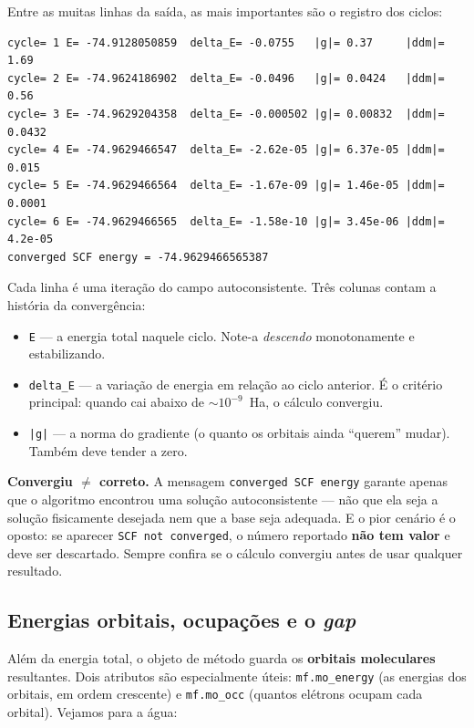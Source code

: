 \documentclass[11pt,a4paper,openany]{book}
\newcommand{\code}[1]{\texttt{#1}}
\begin{document}
\noindent
Entre as muitas linhas da saída, as mais importantes são o registro dos ciclos:

\begin{lstlisting}[style=console]
cycle= 1 E= -74.9128050859  delta_E= -0.0755   |g|= 0.37     |ddm|= 1.69
cycle= 2 E= -74.9624186902  delta_E= -0.0496   |g|= 0.0424   |ddm|= 0.56
cycle= 3 E= -74.9629204358  delta_E= -0.000502 |g|= 0.00832  |ddm|= 0.0432
cycle= 4 E= -74.9629466547  delta_E= -2.62e-05 |g|= 6.37e-05 |ddm|= 0.015
cycle= 5 E= -74.9629466564  delta_E= -1.67e-09 |g|= 1.46e-05 |ddm|= 0.0001
cycle= 6 E= -74.9629466565  delta_E= -1.58e-10 |g|= 3.45e-06 |ddm|= 4.2e-05
converged SCF energy = -74.9629466565387
\end{lstlisting}

\noindent
Cada linha é uma iteração do campo autoconsistente. Três colunas contam a
história da convergência:

\begin{itemize}[leftmargin=*]
  \item \code{E} --- a energia total naquele ciclo. Note-a \emph{descendo}
        monotonamente e estabilizando.
  \item \code{delta\_E} --- a variação de energia em relação ao ciclo anterior. É o
        critério principal: quando cai abaixo de $\sim 10^{-9}$~Ha, o cálculo
        convergiu.
  \item \code{|g|} --- a norma do gradiente (o quanto os orbitais ainda ``querem''
        mudar). Também deve tender a zero.
\end{itemize}

\begin{caixaatencao}
\textbf{Convergiu $\neq$ correto.} A mensagem \code{converged SCF energy} garante
apenas que o algoritmo encontrou uma solução autoconsistente --- não que ela seja
a solução fisicamente desejada nem que a base seja adequada. E o pior cenário é o
oposto: se aparecer \code{SCF not converged}, o número reportado
\textbf{não tem valor} e deve ser descartado. Sempre confira se o cálculo
convergiu antes de usar qualquer resultado.
\end{caixaatencao}

\subsection{Energias orbitais, ocupações e o \emph{gap}}

Além da energia total, o objeto de método guarda os \textbf{orbitais moleculares}
resultantes. Dois atributos são especialmente úteis: \code{mf.mo\_energy} (as
energias dos orbitais, em ordem crescente) e \code{mf.mo\_occ} (quantos elétrons
ocupam cada orbital). Vejamos para a água:
\end{document}

